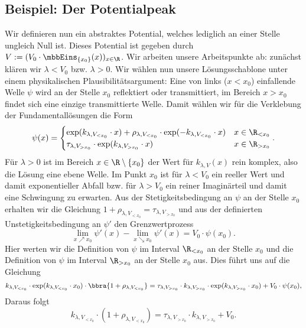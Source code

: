 \documentclass{subfiles}
\begin{document}
    \subsection{Beispiel: Der Potentialpeak}
        Wir definieren nun ein abstraktes Potential, welches lediglich an einer Stelle ungleich Null ist. Dieses Potential ist gegeben durch $V:=(V_0\cdot\mbbEins_{\{x_0\}}(x))_{x\in\R}$. Wir arbeiten unsere Arbeitspunkte ab: zunächst klären wir $\lambda < V_0$ bzw. $\lambda > 0$. Wir wählen nun unsere Lösungsschablone unter einem physikalischen Plausibilitätsargument: Eine von links ($x<x_0$) einfallende Welle $\psi$ wird an der Stelle $x_0$ reflektiert oder transmittiert, im Bereich $x>x_0$ findet sich eine einzige transmittierte Welle. Damit wählen wir für die Verklebung der Fundamentallösungen die Form
        \[
            \psi(x) = \begin{cases}
                \exp(k_{\lambda,V_{<x_0}}\cdot x) + \rho_{\lambda,V_{<x_0}}\cdot\exp(-k_{\lambda,V_{<x_0}}\cdot x) & x\in\R_{<x_0} \\
                \tau_{\lambda,V_{>x_0}}\cdot\exp(k_{\lambda,V_{>x_0}}\cdot x) & x\in\R_{>x_0}
            \end{cases}.
        \]
        Für $\lambda > 0$ ist im Bereich $x\in\R\setminus\{x_0\}$ der Wert für $k_{\lambda,V}(x)$ rein komplex, also die Lösung eine ebene Welle. Im Punkt $x_0$ ist für $\lambda < V_0$ ein reeller Wert und damit exponentieller Abfall bzw. für $\lambda > V_0$ ein reiner Imaginärteil und damit eine Schwingung zu erwarten. 
        Aus der Stetigkeitsbedingung an $\psi$ an der Stelle $x_0$ erhalten wir die Gleichung $1 + \rho_{\lambda,V_{<x_0}} = \tau_{\lambda,V_{>x_0}}$ und aus der definierten Unstetigkeitsbedingung an $\psi'$ den Grenzwertprozess
        \[
            \lim_{x\nearrow x_0} \psi'(x) - \lim_{x\searrow x_0} \psi'(x) = V_0\cdot\psi(x_0).
        \]
        Hier werten wir die Definition von $\psi$ im Interval $\R_{<x_0}$ an der Stelle $x_0$ und die Definition von $\psi$ im Interval $\R_{>x_0}$ an der Stelle $x_0$ aus. Dies führt uns auf die Gleichung
        \[
            k_{\lambda,V_{<x_0}}\cdot\exp(k_{\lambda,V_{<x_0}}\cdot x_0)\cdot\bbra{1 + \rho_{\lambda,V_{<x_0}}} = \tau_{\lambda,V_{>x_0}}\cdot k_{\lambda,V_{>x_0}}\cdot\exp(k_{\lambda,V_{>x_0}}\cdot x_0) + V_0\cdot\psi(x_0),
        \] 
        \vspace{1cm}
        Daraus folgt
        \[
            k_{\lambda,V_{<x_0}}\cdot (1 + \rho_{\lambda,V_{<x_0}}) = \tau_{\lambda,V_{>x_0}}\cdot k_{\lambda,V_{>x_0}} + V_0.
        \]
\end{document}
